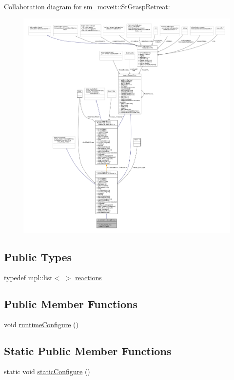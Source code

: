 Collaboration diagram for sm\+\_\+moveit\+:\+:St\+Grasp\+Retreat\+:
\nopagebreak
\begin{figure}[H]
\begin{center}
\leavevmode
\includegraphics[width=350pt]{structsm__moveit_1_1StGraspRetreat__coll__graph}
\end{center}
\end{figure}
\subsection*{Public Types}
\begin{DoxyCompactItemize}
\item 
typedef mpl\+::list$<$  $>$ \hyperlink{structsm__moveit_1_1StGraspRetreat_aff20750564362e567ec149d121219665}{reactions}
\end{DoxyCompactItemize}
\subsection*{Public Member Functions}
\begin{DoxyCompactItemize}
\item 
void \hyperlink{structsm__moveit_1_1StGraspRetreat_a8df0b6fcb2ab2c73738cb1eeddc8f23d}{runtime\+Configure} ()
\end{DoxyCompactItemize}
\subsection*{Static Public Member Functions}
\begin{DoxyCompactItemize}
\item 
static void \hyperlink{structsm__moveit_1_1StGraspRetreat_a6cf0a6a02b733a7967a1a9cb6e6fc852}{static\+Configure} ()
\end{DoxyCompactItemize}
